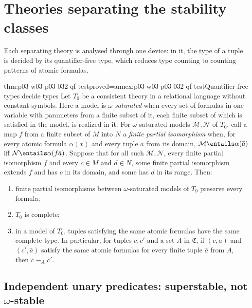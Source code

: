 \section{Theories separating the stability classes}
\label{sec:p03-w03-p03-032-separating}

Each separating theory is analysed through one device: in it, the type of a
tuple is decided by its quantifier-free type, which reduces type counting to
counting patterns of atomic formulas.

\begin{hblemma}{thm:p03-w03-p03-032-qf-test}{proved=annex:p03-w03-p03-032-qf-test}{Quantifier-free types decide types}
Let \(T_0\) be a consistent theory in a relational language without
constant symbols.  Here a model is \emph{\(\omega\)-saturated} when every
set of formulas in one variable with parameters from a finite subset of it,
each finite subset of which is satisfied in the model, is realized in it.
For \(\omega\)-saturated models \(\mathcal M,\mathcal N\)
of \(T_0\), call a map \(f\) from a finite subset of \(M\) into \(N\) a
\emph{finite partial isomorphism} when, for every atomic formula
\(\alpha(\bar x)\) and every tuple \(\bar a\) from its domain,
\(\mathcal M\entails\alpha(\bar a)\) iff
\(\mathcal N\entails\alpha(f\bar a)\).  Suppose that for all such
\(\mathcal M,\mathcal N\), every finite partial isomorphism \(f\) and every
\(c\in M\) and \(d\in N\), some finite partial isomorphism extends \(f\) and
has \(c\) in its domain, and some has \(d\) in its range.  Then:
\begin{enumerate}
  \item finite partial isomorphisms between \(\omega\)-saturated models of
        \(T_0\) preserve every formula;
  \item \(T_0\) is complete;
  \item in a model of \(T_0\), tuples satisfying the same atomic formulas
        have the same complete type.  In particular, for tuples \(c,c'\) and
        a set \(A\) in \(\mathfrak C\), if \((c,\bar a)\) and
        \((c',\bar a)\) satisfy the same atomic formulas for every finite
        tuple \(\bar a\) from \(A\), then \(c\equiv_A c'\).
\end{enumerate}
\end{hblemma}

\subsection{Independent unary predicates: superstable, not
\texorpdfstring{\(\omega\)}{omega}-stable}

